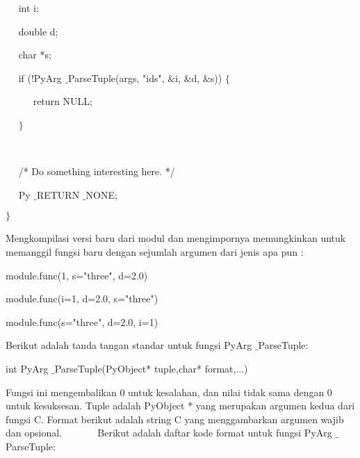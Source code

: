 \documentclass[a4paper,12pt]{report}
\begin{document}
\noindent 
~~ int i; \par
\noindent 
~~ double d; \par
\noindent 
~~ char *s; \par
\vspace{12pt}
\noindent 
~~ if (!PyArg $  \_  $ParseTuple(args, "ids",  $  \&  $i,  $  \&  $d,  $  \&  $s))  $  \{  $ \par
\noindent 
~~~~~ return NULL; \par
\noindent 
~~  $  \}  $ \par
\noindent 
~~  \par
\noindent 
~~ /* Do something interesting here. */ \par
\noindent 
~~ Py $  \_  $RETURN $  \_  $NONE; \par
\noindent 
 $  \}  $ \par
\vspace{12pt}
Mengkompilasi versi baru dari modul dan mengimpornya memungkinkan untuk memanggil fungsi baru dengan sejumlah argumen dari jenis apa pun : \par
\noindent 
module.func(1, s="three", d=2.0) \par
\noindent 
module.func(i=1, d=2.0, s="three") \par
\noindent 
module.func(s="three", d=2.0, i=1) \par
\vspace{12pt}
\vspace{12pt}
\vspace{12pt}
\vspace{12pt}
\noindent 
 \hspace*{0.5in} Berikut adalah tanda tangan standar untuk fungsi PyArg $  \_  $ParseTuple: \par
\noindent 
int PyArg $  \_  $ParseTuple(PyObject* tuple,char* format,...) \par
\vspace{12pt}
\noindent 
 \hspace*{0.5in} Fungsi ini mengembalikan 0 untuk kesalahan, dan nilai tidak sama dengan 0 untuk kesuksesan. Tuple adalah PyObject * yang merupakan argumen kedua dari fungsi C. Format berikut adalah string C yang menggambarkan argumen wajib dan opsional.\vspace{\baselineskip}
~~~~~~ Berikut adalah daftar kode format untuk fungsi PyArg $  \_  $ParseTuple: \par


\end{document}
